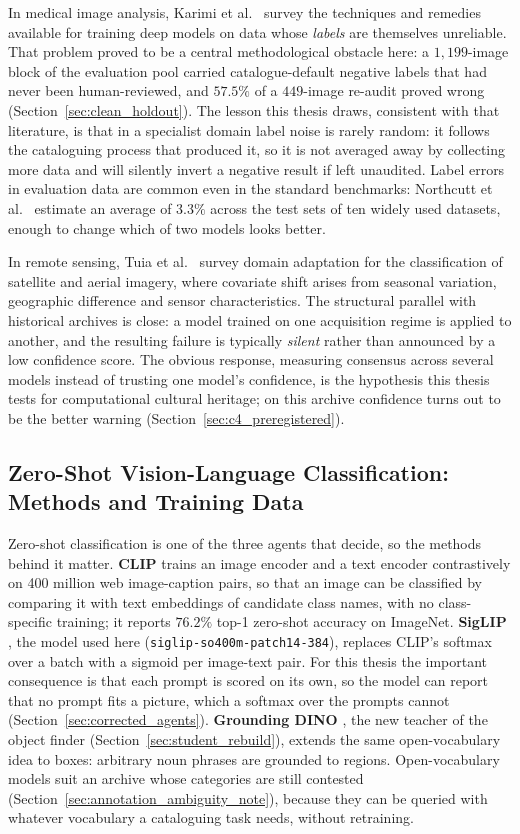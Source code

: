 \documentclass[12pt,a4paper]{report}
\begin{document}
In medical image analysis, Karimi et al.~\cite{karimi2020noisy} survey the techniques and remedies available for training deep models on data whose \emph{labels} are themselves unreliable. That problem proved to be a central methodological obstacle here: a $1{,}199$-image block of the evaluation pool carried catalogue-default negative labels that had never been human-reviewed, and $57.5\%$ of a $449$-image re-audit proved wrong (Section~\ref{sec:clean_holdout}). The lesson this thesis draws, consistent with that literature, is that in a specialist domain label noise is rarely random: it follows the cataloguing process that produced it, so it is not averaged away by collecting more data and will silently invert a negative result if left unaudited. Label errors in evaluation data are common even in the standard benchmarks: Northcutt et al.~\cite{northcutt2021labelerrors} estimate an average of $3.3\%$ across the test sets of ten widely used datasets, enough to change which of two models looks better.

In remote sensing, Tuia et al.~\cite{tuia2016domain} survey domain adaptation for the classification of satellite and aerial imagery, where covariate shift arises from seasonal variation, geographic difference and sensor characteristics. The structural parallel with historical archives is close: a model trained on one acquisition regime is applied to another, and the resulting failure is typically \emph{silent} rather than announced by a low confidence score. The obvious response, measuring consensus across several models instead of trusting one model's confidence, is the hypothesis this thesis tests for computational cultural heritage; on this archive confidence turns out to be the better warning (Section~\ref{sec:c4_preregistered}).

\subsection{Zero-Shot Vision-Language Classification: Methods and Training Data}
Zero-shot classification is one of the three agents that decide, so the methods behind it matter. \textbf{CLIP} \cite{clip2021} trains an image encoder and a text encoder contrastively on 400 million web image-caption pairs, so that an image can be classified by comparing it with text embeddings of candidate class names, with no class-specific training; it reports $76.2\%$ top-1 zero-shot accuracy on ImageNet. \textbf{SigLIP} \cite{siglip2023}, the model used here (\texttt{siglip-so400m-patch14-384}), replaces CLIP's softmax over a batch with a sigmoid per image-text pair. For this thesis the important consequence is that each prompt is scored on its own, so the model can report that no prompt fits a picture, which a softmax over the prompts cannot (Section~\ref{sec:corrected_agents}). \textbf{Grounding DINO} \cite{groundingdino2023}, the new teacher of the object finder (Section~\ref{sec:student_rebuild}), extends the same open-vocabulary idea to boxes: arbitrary noun phrases are grounded to regions. Open-vocabulary models suit an archive whose categories are still contested (Section~\ref{sec:annotation_ambiguity_note}), because they can be queried with whatever vocabulary a cataloguing task needs, without retraining.
\end{document}
